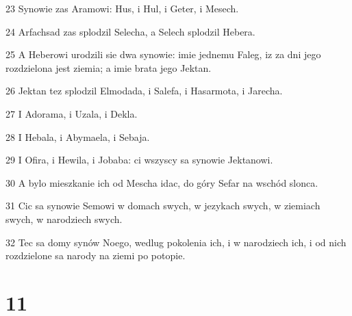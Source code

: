 \par 23 Synowie zas Aramowi: Hus, i Hul, i Geter, i Mesech.
\par 24 Arfachsad zas splodzil Selecha, a Selech splodzil Hebera.
\par 25 A Heberowi urodzili sie dwa synowie: imie jednemu Faleg, iz za dni jego rozdzielona jest ziemia; a imie brata jego Jektan.
\par 26 Jektan tez splodzil Elmodada, i Salefa, i Hasarmota, i Jarecha.
\par 27 I Adorama, i Uzala, i Dekla.
\par 28 I Hebala, i Abymaela, i Sebaja.
\par 29 I Ofira, i Hewila, i Jobaba: ci wszyscy sa synowie Jektanowi.
\par 30 A bylo mieszkanie ich od Mescha idac, do góry Sefar na wschód slonca.
\par 31 Cic sa synowie Semowi w domach swych, w jezykach swych, w ziemiach swych, w narodziech swych.
\par 32 Tec sa domy synów Noego, wedlug pokolenia ich, i w narodziech ich, i od nich rozdzielone sa narody na ziemi po potopie.

\chapter{11}

